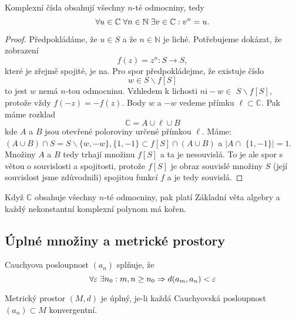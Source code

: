 \documentclass[../main.tex]{subfiles}
\begin{document}
\begin{theorem}
    Komplexní čísla obsahují všechny $n$-té odmocniny, tedy
    \[ \forall u \in \mathbb{C} \hspace{1mm} \forall n \in \mathbb{N} \hspace{1mm} \exists v \in \mathbb{C}: v^n = u. \]
\end{theorem}
\begin{proof}
    Předpokládáme, že $u \in S$ a že $n \in \mathbb{N}$ je liché. Potřebujeme dokázat, že zobrazení
    \[ f(z)=z^n: S \rightarrow S, \]
    které je zřejmě spojité, je na. Pro spor předpokládejme, že existuje číslo
    \[ w \in S \backslash f[S] \]
    to jest $w$ nemá $n$-tou odmocninu. Vzhledem k lichosti $n \mathrm{i}-w \in$ $S \backslash f[S]$, protože vždy $f(-z)=-f(z)$.
    Body $w$ a $-w$ vedeme přímku $\ell \subset \mathbb{C}$. Pak máme rozklad
    \[ \mathbb{C}=A \cup \ell \cup B \]
    kde $A$ a $B$ jsou otevřené poloroviny určené přímkou $\ell$. Máme: $(A \cup B) \cap S=S \backslash\{w,-w\},\{1,-1\} \subset f[S] \cap(A \cup B)$ 
    a $\mid A \cap$ $\{1,-1\} \mid=1$. Množiny $A$ a $B$ tedy trhají množinu $f[S]$ a ta je nesouvislá. To je ale spor s větou o souvislosti a spojitosti,
    protože $f[S]$ je obraz souvislé množiny $S$ (její souvislost jsme zdůvodnili) spojitou funkcí $f$ a je tedy souvislá.
\end{proof}

\begin{lemma}
    Když $\mathbb{C}$ obsahuje všechny $n$-té odmocniny, pak platí Základní věta algebry a každý nekonstantní
    komplexní polynom má kořen.
\end{lemma}

\subsection{Úplné množiny a metrické prostory}

\begin{definition}
    Cauchyova posloupnost $(a_n)$ splňuje, že
    \[ \forall \varepsilon \hspace{1mm} \exists n_0: m,n \geq n_0 \Rightarrow d(a_m,a_n) < \varepsilon \]
\end{definition}

\begin{definition}
    Metrický prostor $(M,d)$ je úplný, je-li každá Cauchyovská posloupnost $(a_n) \subset M$ konvergentní.
\end{definition}
\end{document}
